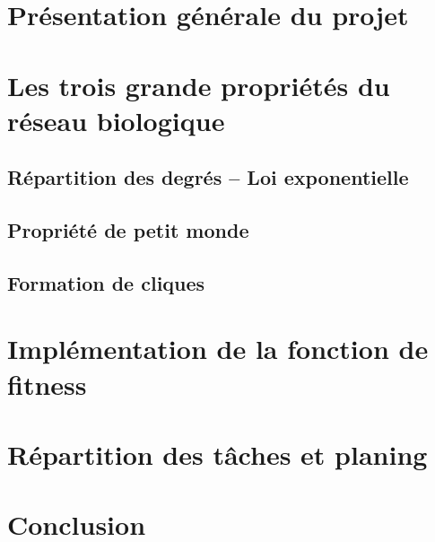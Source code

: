 


\maketitle

\section{Présentation générale du projet}


\section{Les trois grande propriétés du réseau biologique}

\subsection{Répartition des degrés -- Loi exponentielle}

\subsection{Propriété de petit monde}

\subsection{Formation de cliques}


\section{Implémentation de la fonction de fitness}


\section{Répartition des tâches et planing}


\section{Conclusion}


